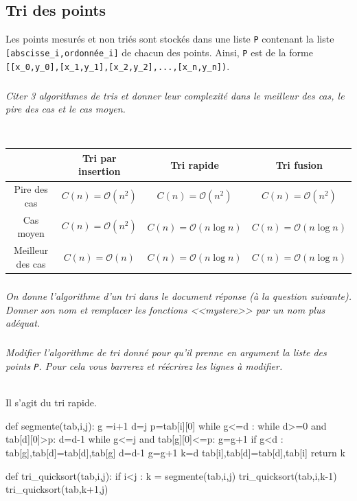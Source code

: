 \documentclass[10pt,fleqn]{article} %
\begin{document}
\subsection{Tri des points}
\ifprof
\else
Les points mesurés et non triés sont stockés dans une liste \texttt{P} contenant la liste \texttt{[abscisse\_i,ordonnée\_i]} de chacun des points. Ainsi, \texttt{P} est de la forme \texttt{[[x\_0,y\_0],[x\_1,y\_1],[x\_2,y\_2],...,[x\_n,y\_n])}.
\fi
\subparagraph{}
\textit{Citer 3 algorithmes de tris et donner leur complexité dans le meilleur des cas, le pire des cas et le cas moyen.} ~\\
\ifprof
\begin{corrige} ~\\
\begin{center}
\begin{tabular}{|c|c|c|c|}
\hline
& Tri par insertion & Tri rapide & Tri fusion \\
\hline 

{Pire des cas}&  $ C(n)=\mathcal{O}\left(n^2 \right)$ & $ C(n)=\mathcal{O}\left(n^2 \right)$ & $ C(n)=\mathcal{O}\left(n^2\right)$ \\ \hline
Cas moyen & $ C(n)=\mathcal{O}\left(n^2 \right)$ &$ C(n)=\mathcal{O}\left(n \log n\right)$  & $ C(n)=\mathcal{O}\left(n \log n\right)$ \\ \hline
Meilleur des cas   & $ C(n)=\mathcal{O}\left(n \right)$ & $ C(n)=\mathcal{O}\left(n \log n \right)$ & $ C(n)=\mathcal{O}\left(n \log n\right)$ \\ \hline
\end{tabular}
\end{center}
\end{corrige}
\else
\fi

\subparagraph{}
\textit{On donne l'algorithme d'un tri dans le document réponse (à la question suivante). Donner son nom et remplacer les fonctions <<mystere>> par un nom plus adéquat.}
\subparagraph{}
\textit{Modifier l'algorithme de tri donné pour qu'il prenne en argument la liste des points \texttt{P}. Pour cela vous barrerez et réécrirez les lignes à modifier. }

\ifprof
\begin{corrige} ~\\
Il s'agit du tri rapide.

\begin{py}
\begin{python}
def segmente(tab,i,j):
    g =i+1
    d=j
    p=tab[i][0]
    while g<=d :
        while d>=0 and tab[d][0]>p:
            d=d-1
        while g<=j and tab[g][0]<=p:
            g=g+1
        if g<d :
            tab[g],tab[d]=tab[d],tab[g]
            d=d-1
            g=g+1
    k=d
    tab[i],tab[d]=tab[d],tab[i]
    return k
    
def tri_quicksort(tab,i,j):
    if i<j :
        k = segmente(tab,i,j)
        tri_quicksort(tab,i,k-1)
        tri_quicksort(tab,k+1,j)

\end{python}
\end{py}
\end{corrige}
\else
\fi
\end{document}
